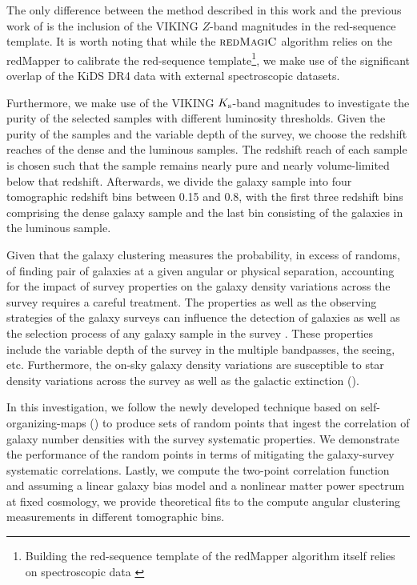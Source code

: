 \documentclass[fleqn,usenatbib,useAMS]{mnras}
\begin{document}
The only difference between the method described in this work and the previous work of \citet{vakili2019} is the inclusion of the VIKING $Z$-band magnitudes in the red-sequence template. It is worth noting that while the $\textsc{redMagiC}$ algorithm relies on the redMapper \citealt{redmap_des} to calibrate the red-sequence template\footnote{Building the red-sequence template of the redMapper algorithm itself relies on spectroscopic data \citealt{redmap_sdss}}, we make use of the significant overlap of the KiDS DR4 data with external spectroscopic datasets. 

Furthermore, we make use of the VIKING $K_{\rm s}$-band magnitudes to investigate the purity of the selected samples with different luminosity thresholds. Given the purity of the samples and the variable depth of the survey, we choose the redshift reaches of the dense and the luminous samples. The redshift reach of each sample is chosen such that the sample remains nearly pure and nearly volume-limited below that redshift. Afterwards, we divide the galaxy sample into four tomographic redshift bins between 0.15 and 0.8, with the first three redshift bins comprising the dense galaxy sample and the last bin consisting of the galaxies in the luminous sample. 

Given that the galaxy clustering measures the probability, in excess of randoms, of finding pair of galaxies at a given angular or physical separation, accounting for the impact of survey properties on the galaxy density variations across the survey requires a careful treatment. The properties as well as the observing strategies of the galaxy surveys can influence the detection of galaxies as well as the selection process of any galaxy sample in the survey \citep[e.g.][]{alam2017,kwan2017,ross2017,elvin2017,crocce2019,kalus2019}. These properties include the variable depth of the survey in the multiple bandpasses, the seeing, etc. Furthermore, the on-sky galaxy density variations are susceptible to star density variations across the survey as well as the galactic extinction (\citealt{ignacio2018,rezaie2019}). 

In this investigation, we follow the newly developed technique based on self-organizing-maps (\citealt{johntson2019}) to produce sets of random points that ingest the correlation of galaxy number densities with the survey systematic properties. We demonstrate the performance of the random points in terms of mitigating the galaxy-survey systematic correlations. Lastly, we compute the two-point correlation function and assuming a linear galaxy bias model and a nonlinear matter power spectrum at fixed cosmology, we provide theoretical fits to the compute angular clustering measurements in different tomographic bins. 
\end{document}
